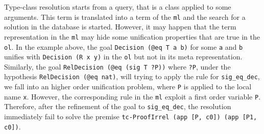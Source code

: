 \documentclass[sigconf,natbib=false]{acmart}
\def\coq{\proglang{coq}}
\newcommand*{\acronym}[1]{\texttt{#1}\xspace}
\def\ol{\acronym{ol}} %
\def\ml{\acronym{ml}} %
\begin{document}
Type-class resolution starts from a query, that is a class applied to some
arguments. This \coq term is translated into a term of the \ml and the search
for a solution in the database is started. However, it may happen that the term
representation in the \ml may hide some unification properties that are true in
the \ol. In the example above, the goal \texttt{Decision (@eq T a b)} for some
\texttt{a} and \texttt{b} unifies with \texttt{Decision (R x y)} in the \ol but
not in its meta representation. Similarly, the goal \texttt{RelDecision (@eq
(sig T ?P))} where \texttt{?P}, under the hypothesis \texttt{RelDecision (@eq
nat)}, will trying to apply the rule for \texttt{sig\_eq\_dec}, we fall into an
higher order unification problem, where \texttt{P} is applied to the local name
\texttt{x}. However, the corresponding rule in the \ml exploit a first order
variable \texttt{P}. Therefore, after the refinement of the goal to
\texttt{sig\_eq\_dec}, the resolution immediately fail to solve the premise
\texttt{tc-ProofIrrel (app [P, c0]) (app [P1, c0])}.

\printbibliography
\end{document}
